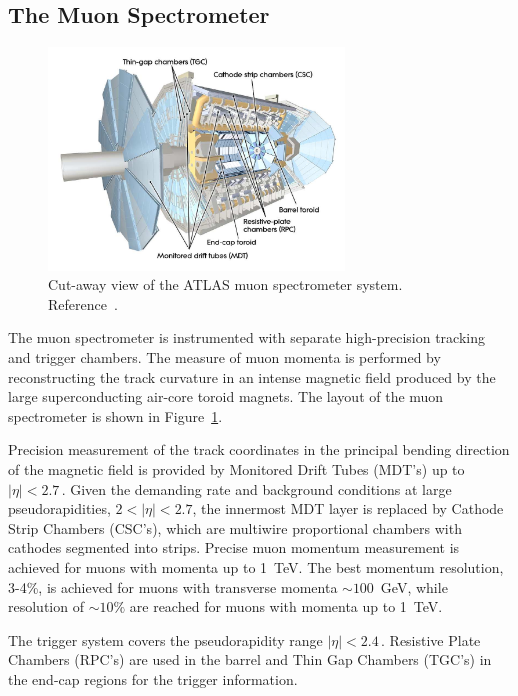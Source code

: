 \subsection{The Muon Spectrometer}
\begin{figure}[tp]
     \begin{center}

            \includegraphics[width=0.7\textwidth]{figure/muonSpec.png}

    \end{center}
    \caption{Cut-away view of the ATLAS muon spectrometer system. Reference~\cite{ATLASDetector}.}



   \label{fig:atlasMu}
\end{figure}
The muon spectrometer is instrumented with separate high-precision tracking and trigger chambers. The measure of muon momenta is performed 
by reconstructing the track curvature in an intense magnetic field produced by the large superconducting air-core toroid magnets.
The layout of the muon spectrometer is shown in Figure~\ref{fig:atlasMu}.

Precision measurement of the track coordinates in the principal bending direction of the 
magnetic field is provided by Monitored Drift Tubes (MDT’s) up to $|\eta| < 2.7\,.$ Given the demanding rate and background conditions
at large pseudorapidities, $2 < |\eta| < 2.7$, the innermost MDT layer is replaced by  Cathode Strip Chambers (CSC’s), which are multiwire
proportional chambers with cathodes segmented into strips. Precise muon momentum measurement is achieved for muons with momenta up to 1~TeV.
The best momentum resolution, 3-4\%, is achieved for muons with transverse momenta $\sim 100$~GeV, while resolution of $\sim 10\%$ are reached for muons
with momenta up to 1~TeV. 

The trigger system covers the pseudorapidity range $|\eta| < 2.4\,.$ Resistive Plate Chambers
(RPC’s) are used in the barrel and Thin Gap Chambers (TGC’s) in the end-cap regions for the trigger information. 


